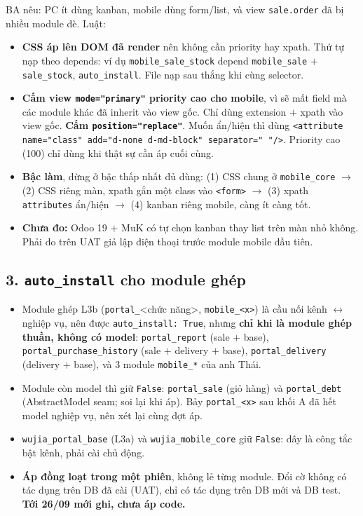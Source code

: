 BA nêu: PC ít dùng kanban, mobile dùng form/list, và view \texttt{sale.order} đã bị nhiều module đè. Luật:
\begin{itemize}[nosep]
\item \textbf{CSS áp lên DOM đã render} nên không cần priority hay xpath. Thứ tự nạp theo depends: ví dụ
  \texttt{mobile\_sale\_stock} depend \texttt{mobile\_sale} $+$ \texttt{sale\_stock}, \texttt{auto\_install}.
  File nạp sau thắng khi cùng selector.
\item \textbf{Cấm view \texttt{mode="primary"} priority cao cho mobile}, vì sẽ mất field mà các module khác đã
  inherit vào view gốc. Chỉ dùng extension $+$ xpath vào view gốc. \textbf{Cấm \texttt{position="replace"}}.
  Muốn ẩn/hiện thì dùng \texttt{<attribute name="class" add="d-none d-md-block" separator=" "/>}. Priority cao
  (100) chỉ dùng khi thật sự cần áp cuối cùng.
\item \textbf{Bậc làm}, dừng ở bậc thấp nhất đủ dùng: (1) CSS chung ở \texttt{mobile\_core} $\to$ (2) CSS riêng màn,
  xpath gắn một class vào \texttt{<form>} $\to$ (3) xpath \texttt{attributes} ẩn/hiện $\to$ (4) kanban riêng mobile,
  càng ít càng tốt.
\item \textbf{Chưa đo:} Odoo 19 $+$ MuK có tự chọn kanban thay list trên màn nhỏ không. Phải đo trên UAT giả lập
  điện thoại trước module mobile đầu tiên.
\end{itemize}

\subsection*{3. \texttt{auto\_install} cho module ghép}

\begin{itemize}[nosep]
\item Module ghép L3b (\texttt{portal\_}<chức năng>, \texttt{mobile\_<x>}) là cầu nối kênh $\leftrightarrow$
  nghiệp vụ, nên được \texttt{auto\_install: True}, nhưng \textbf{chỉ khi là module ghép thuần, không có model}:
  \texttt{portal\_report} (sale $+$ base), \texttt{portal\_purchase\_history} (sale $+$ delivery $+$ base),
  \texttt{portal\_delivery} (delivery $+$ base), và 3 module \texttt{mobile\_*} của anh Thái.
\item Module còn model thì giữ \texttt{False}: \texttt{portal\_sale} (giỏ hàng) và \texttt{portal\_debt}
  (AbstractModel seam; soi lại khi áp). Bảy \texttt{portal\_<x>} sau khối A đã hết model nghiệp vụ, nên xét lại
  cùng đợt áp.
\item \texttt{wujia\_portal\_base} (L3a) và \texttt{wujia\_mobile\_core} giữ \texttt{False}: đây là công tắc bật
  kênh, phải cài chủ động.
\item \textbf{Áp đồng loạt trong một phiên}, không lẻ từng module. Đổi cờ không có tác dụng trên DB đã cài (UAT),
  chỉ có tác dụng trên DB mới và DB test. \textbf{Tới 26/09 mới ghi, chưa áp code.}
\end{itemize}

